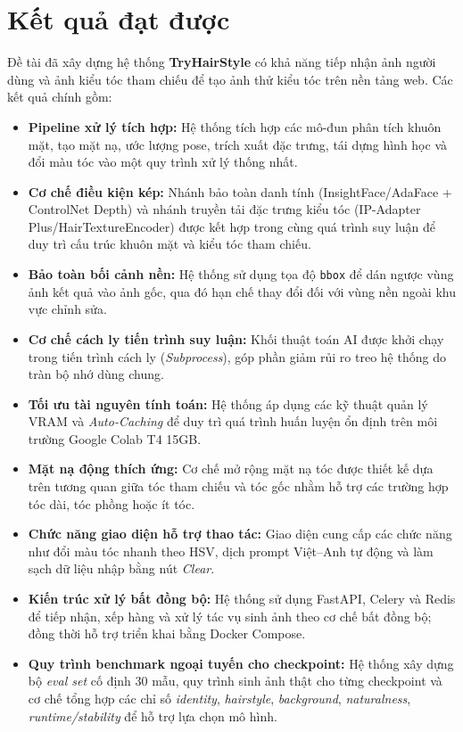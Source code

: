 \documentclass[../main.tex]{subfiles}
\begin{document}
\section{Kết quả đạt được}
Đề tài đã xây dựng hệ thống \textbf{TryHairStyle} có khả năng tiếp nhận ảnh người dùng và ảnh kiểu tóc tham chiếu để tạo ảnh thử kiểu tóc trên nền tảng web. Các kết quả chính gồm:
\begin{itemize}
    \item \textbf{Pipeline xử lý tích hợp:} Hệ thống tích hợp các mô-đun phân tích khuôn mặt, tạo mặt nạ, ước lượng pose, trích xuất đặc trưng, tái dựng hình học và đổi màu tóc vào một quy trình xử lý thống nhất.
    \item \textbf{Cơ chế điều kiện kép:} Nhánh bảo toàn danh tính (InsightFace/AdaFace + ControlNet Depth) và nhánh truyền tải đặc trưng kiểu tóc (IP-Adapter Plus/HairTextureEncoder) được kết hợp trong cùng quá trình suy luận để duy trì cấu trúc khuôn mặt và kiểu tóc tham chiếu.
    \item \textbf{Bảo toàn bối cảnh nền:} Hệ thống sử dụng tọa độ \texttt{bbox} để dán ngược vùng ảnh kết quả vào ảnh gốc, qua đó hạn chế thay đổi đối với vùng nền ngoài khu vực chỉnh sửa.
    \item \textbf{Cơ chế cách ly tiến trình suy luận:} Khối thuật toán AI được khởi chạy trong tiến trình cách ly (\textit{Subprocess}), góp phần giảm rủi ro treo hệ thống do tràn bộ nhớ dùng chung.
    \item \textbf{Tối ưu tài nguyên tính toán:} Hệ thống áp dụng các kỹ thuật quản lý VRAM và \textit{Auto-Caching} để duy trì quá trình huấn luyện ổn định trên môi trường Google Colab T4 15GB.
    \item \textbf{Mặt nạ động thích ứng:} Cơ chế mở rộng mặt nạ tóc được thiết kế dựa trên tương quan giữa tóc tham chiếu và tóc gốc nhằm hỗ trợ các trường hợp tóc dài, tóc phồng hoặc ít tóc.
    \item \textbf{Chức năng giao diện hỗ trợ thao tác:} Giao diện cung cấp các chức năng như đổi màu tóc nhanh theo HSV, dịch prompt Việt--Anh tự động và làm sạch dữ liệu nhập bằng nút \textit{Clear}.
    \item \textbf{Kiến trúc xử lý bất đồng bộ:} Hệ thống sử dụng FastAPI, Celery và Redis để tiếp nhận, xếp hàng và xử lý tác vụ sinh ảnh theo cơ chế bất đồng bộ; đồng thời hỗ trợ triển khai bằng Docker Compose.
    \item \textbf{Quy trình benchmark ngoại tuyến cho checkpoint:} Hệ thống xây dựng bộ \textit{eval set} cố định 30 mẫu, quy trình sinh ảnh thật cho từng checkpoint và cơ chế tổng hợp các chỉ số \textit{identity}, \textit{hairstyle}, \textit{background}, \textit{naturalness}, \textit{runtime/stability} để hỗ trợ lựa chọn mô hình.
\end{itemize}
\end{document}
